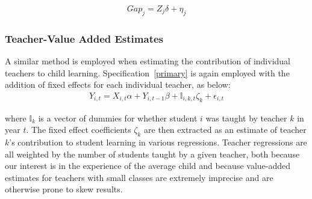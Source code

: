 \documentclass[Eubank_pk_ethnic_sorting.tex]{subfiles}
\begin{document}
\begin{eqnarray*}
	Gap_{j}=Z_{j}\delta+\eta_{j}\label{villagespecification}
\end{eqnarray*}

\subsubsection{Teacher-Value Added Estimates}\label{}
A similar method is employed when estimating the contribution of individual teachers to child learning. Specification~\ref{primary} is again employed with the addition of fixed effects for each individual teacher, as below:
\begin{eqnarray*}
	Y_{i,t}=X_{i,t}\alpha+Y_{i,t-1}\beta + \mathbb{I}_{i,k,t}\zeta_{k}+\epsilon_{i,t}\label{teacherspecification}
\end{eqnarray*}

where $\mathbb{I}_{k}$ is a vector of dummies for whether student $i$ was taught by teacher $k$ in year $t$. The fixed effect coefficients $\zeta_{k}$ are then extracted as an estimate of teacher $k$'s contribution to student learning in various regressions. Teacher regressions are all weighted by the number of students taught by a given teacher, both because our interest is in the experience of the average child and because value-added estimates for teachers with small classes are extremely imprecise and are otherwise prone to skew results. 

\end{document}
